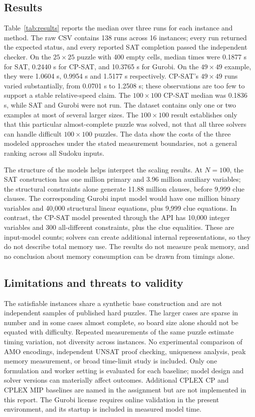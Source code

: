 \documentclass[a4paper,fleqn]{cas-sc}
\begin{document}
\subsection{Results}
Table~\ref{tab:results} reports the median over three runs for each instance and method. The raw CSV contains 138 runs across 16 instances; every run returned the expected status, and every reported SAT completion passed the independent checker. On the \(25\times25\) puzzle with 400 empty cells, median times were 0.1877 s for SAT, 0.2440 s for CP-SAT, and 10.3765 s for Gurobi. On the \(49\times49\) example, they were 1.0604 s, 0.9954 s and 1.5177 s respectively. CP-SAT's \(49\times49\) runs varied substantially, from 0.0701 s to 1.2508 s; these observations are too few to support a stable relative-speed claim. The \(100\times100\) CP-SAT median was 0.1836 s, while SAT and Gurobi were not run. The dataset contains only one or two examples at most of several larger sizes. The \(100\times100\) result establishes only that this particular almost-complete puzzle was solved, not that all three solvers can handle difficult \(100\times100\) puzzles. The data show the costs of the three modeled approaches under the stated measurement boundaries, not a general ranking across all Sudoku inputs.



The structure of the models helps interpret the scaling results. At \(N=100\), the SAT construction has one million primary and 3.96 million auxiliary variables; the structural constraints alone generate 11.88 million clauses, before 9,999 clue clauses. The corresponding Gurobi input model would have one million binary variables and 40,000 structural linear equations, plus 9,999 clue equations. In contrast, the CP-SAT model presented through the API has 10,000 integer variables and 300 all-different constraints, plus the clue equalities. These are input-model counts; solvers can create additional internal representations, so they do not describe total memory use. The results do not measure peak memory, and no conclusion about memory consumption can be drawn from timings alone.

\subsection{Limitations and threats to validity}
The satisfiable instances share a synthetic base construction and are not independent samples of published hard puzzles. The larger cases are sparse in number and in some cases almost complete, so board size alone should not be equated with difficulty. Repeated measurements of the same puzzle estimate timing variation, not diversity across instances. No experimental comparison of AMO encodings, independent UNSAT proof checking, uniqueness analysis, peak memory measurement, or broad time-limit study is included. Only one formulation and worker setting is evaluated for each baseline; model design and solver versions can materially affect outcomes. Additional CPLEX CP and CPLEX MIP baselines are named in the assignment but are not implemented in this report. The Gurobi license requires online validation in the present environment, and its startup is included in measured model time.
\end{document}
